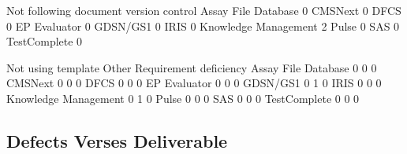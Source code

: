 \documentclass{article}
\begin{document}
\begin{Schunk}
\begin{Soutput}
                       Not following document version control
  Assay File Database                                       0
  CMSNext                                                   0
  DFCS                                                      0
  EP Evaluator                                              0
  GDSN/GS1                                                  0
  IRIS                                                      0
  Knowledge Management                                      2
  Pulse                                                     0
  SAS                                                       0
  TestComplete                                              0
                      
                       Not using template Other Requirement deficiency
  Assay File Database                   0     0                      0
  CMSNext                               0     0                      0
  DFCS                                  0     0                      0
  EP Evaluator                          0     0                      0
  GDSN/GS1                              0     1                      0
  IRIS                                  0     0                      0
  Knowledge Management                  0     1                      0
  Pulse                                 0     0                      0
  SAS                                   0     0                      0
  TestComplete                          0     0                      0
\end{Soutput}
\end{Schunk}

\subsection{Defects Verses Deliverable}
\end{document}

